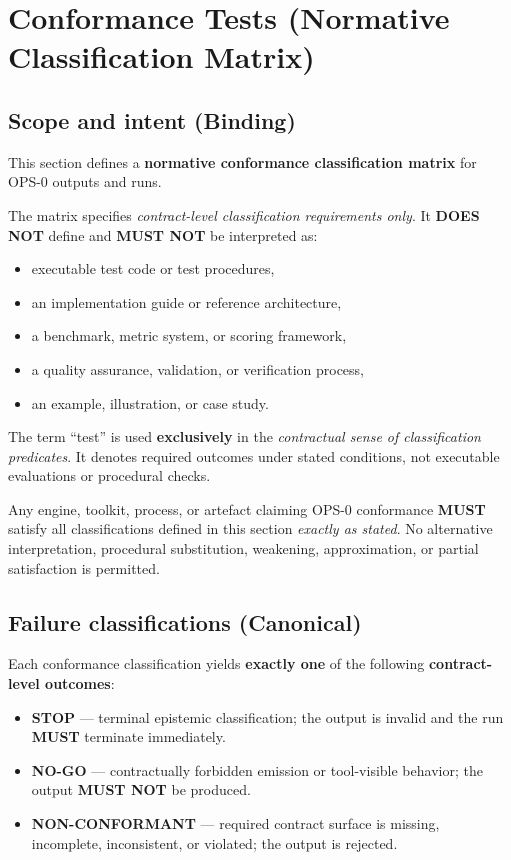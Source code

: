 ﻿\section{Conformance Tests (Normative Classification Matrix)}
\label{sec:ops0_conformance_tests}

\subsection{Scope and intent (Binding)}
This section defines a \textbf{normative conformance classification matrix}
for OPS-0 outputs and runs.

The matrix specifies \emph{contract-level classification requirements only}.
It \textbf{DOES NOT} define and \textbf{MUST NOT} be interpreted as:
\begin{itemize}
  \item executable test code or test procedures,
  \item an implementation guide or reference architecture,
  \item a benchmark, metric system, or scoring framework,
  \item a quality assurance, validation, or verification process,
  \item an example, illustration, or case study.
\end{itemize}

The term ``test'' is used \textbf{exclusively} in the
\emph{contractual sense of classification predicates}.
It denotes required outcomes under stated conditions,
not executable evaluations or procedural checks.

Any engine, toolkit, process, or artefact
claiming OPS-0 conformance
\textbf{MUST} satisfy all classifications
defined in this section
\emph{exactly as stated}.
No alternative interpretation,
procedural substitution,
weakening, approximation,
or partial satisfaction
is permitted.

\subsection{Failure classifications (Canonical)}
Each conformance classification yields
\textbf{exactly one}
of the following
\textbf{contract-level outcomes}:

\begin{itemize}
  \item \textbf{STOP} —
        terminal epistemic classification;
        the output is invalid and the run
        \textbf{MUST} terminate immediately.
  \item \textbf{NO-GO} —
        contractually forbidden emission
        or tool-visible behavior;
        the output \textbf{MUST NOT} be produced.
  \item \textbf{NON-CONFORMANT} —
        required contract surface is missing,
        incomplete, inconsistent, or violated;
        the output is rejected.
\end{itemize}

